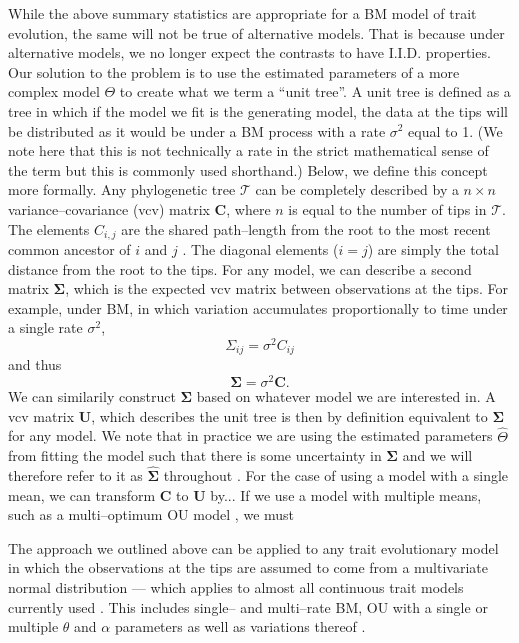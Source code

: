 \documentclass[12pt]{article}
\begin{document}
While the above summary statistics are appropriate for a BM model of trait evolution, the same will not be true of alternative models. That is because under alternative models, we no longer expect the contrasts to have I.I.D. properties. Our solution to the problem is to use the estimated parameters of a more complex model $\Theta$ to create what we term a ``unit tree''. A unit tree is defined as a tree in which if the model we fit is the generating model, the data at the tips will be distributed as it would be under a BM process with a rate $\sigma^2$ equal to 1. (We note here that this is not technically a rate in the strict mathematical sense of the term \citep{Bookstein1987} but this is commonly used shorthand.)  Below, we define this concept more formally. Any phylogenetic tree $\mathcal{T}$ can be completely described by a $n \times n$ variance--covariance (vcv) matrix $\mathbf{C}$, where $n$ is equal to the number of tips in $\mathcal{T}$. The elements $C_{i,j}$ are the shared path--length from the root to the most recent common ancestor of $i$ and $j$ \citep{Piazza1975}. The diagonal elements ($i = j$) are simply the total distance from the root to the tips. For any model, we can describe a second matrix $\mathbf{\Sigma}$, which is the expected vcv matrix between observations at the tips. For example, under BM, in which variation accumulates proportionally to time under a single rate $\sigma^2$, 
\begin{equation}
\Sigma_{ij} = \sigma^2 C_{ij}
\end{equation}
and thus
\begin{equation}
\mathbf{\Sigma} = \sigma^2 \mathbf{C}.
\end{equation}
We can similarily construct $\mathbf{\Sigma}$ based on whatever model we are interested in. A vcv matrix $\mathbf{U}$, which describes the unit tree is then by definition equivalent to $\mathbf{\Sigma}$ for any model. We note that in practice we are using the estimated parameters $\hat{\Theta}$ from fitting the model such that there is some uncertainty in $\mathbf{\Sigma}$ and we will therefore refer to it as $\hat{\mathbf{\Sigma}}$ throughout \citep[see][]{Rohlf2001, Blomberg2012}. For the case of using a model with a single mean, we can transform $\mathbf{C}$ to $\mathbf{U}$ by... If we use a model with multiple means, such as a multi--optimum OU model \citep{ButlerKing2004, Beaulieu2012}, we must 

The approach we outlined above can be applied to any trait evolutionary model in which the observations at the tips are assumed to come from a multivariate normal distribution --- which applies to almost all continuous trait models currently used \citep{Omeara2012}. This includes single-- and multi--rate BM, OU with a single or multiple $\theta$ and $\alpha$ parameters as well as variations thereof \citep[see][for an example of an evolutionary model for which this does not hold]{Landis2012}.
\end{document}
